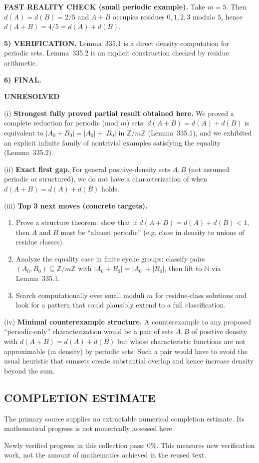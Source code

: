 \medskip
\noindent\textbf{FAST REALITY CHECK (small periodic example).}
Take $m=5$. Then $d(A)=d(B)=2/5$ and $A+B$ occupies residues $0,1,2,3$ modulo $5$, hence $d(A+B)=4/5=d(A)+d(B)$.

\medskip
\noindent\textbf{5) VERIFICATION.}
Lemma~335.1 is a direct density computation for periodic sets. Lemma~335.2 is an explicit construction checked by residue arithmetic.

\medskip
\noindent\textbf{6) FINAL.}

\noindent\textbf{UNRESOLVED}

\smallskip
\noindent (i) \textbf{Strongest fully proved partial result obtained here.}
We proved a complete reduction for periodic (mod $m$) sets: $d(A+B)=d(A)+d(B)$ is equivalent to $|A_0+B_0|=|A_0|+|B_0|$ in $\mathbb{Z}/m\mathbb{Z}$ (Lemma~335.1), and we exhibited an explicit infinite family of nontrivial examples satisfying the equality (Lemma~335.2).

\smallskip
\noindent (ii) \textbf{Exact first gap.}
For general positive-density sets $A,B$ (not assumed periodic or structured), we do not have a characterization of when $d(A+B)=d(A)+d(B)$ holds.

\smallskip
\noindent (iii) \textbf{Top 3 next moves (concrete targets).}
\begin{enumerate}
\item Prove a structure theorem: show that if $d(A+B)=d(A)+d(B)<1$, then $A$ and $B$ must be ``almost periodic'' (e.g. close in density to unions of residue classes).
\item Analyze the equality case in finite cyclic groups: classify pairs $(A_0,B_0)\subseteq\mathbb{Z}/m\mathbb{Z}$ with $|A_0+B_0|=|A_0|+|B_0|$, then lift to $\mathbb{N}$ via Lemma~335.1.
\item Search computationally over small moduli $m$ for residue-class solutions and look for a pattern that could plausibly extend to a full classification.
\end{enumerate}

\smallskip
\noindent (iv) \textbf{Minimal counterexample structure.}
A counterexample to any proposed ``periodic-only'' characterization would be a pair of sets $A,B$ of positive density with $d(A+B)=d(A)+d(B)$ but whose characteristic functions are not approximable (in density) by periodic sets. Such a pair would have to avoid the usual heuristic that sumsets create substantial overlap and hence increase density beyond the sum.




\subsection*{COMPLETION ESTIMATE}
The primary source supplies no extractable numerical completion estimate. Its mathematical progress is not numerically assessed here.

Newly verified progress in this collection pass: $0\%$. This measures new verification work, not the amount of mathematics achieved in the reused text.
